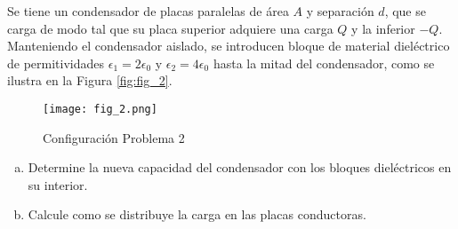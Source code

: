 \noindent Se tiene un condensador de placas paralelas de área $A$ y separación $d$, que se carga de modo tal que su placa superior adquiere una carga $Q$ y la inferior $-Q$. Manteniendo el condensador aislado, se introducen bloque de material dieléctrico de permitividades $\epsilon_1 = 2 \epsilon_0$ y $\epsilon_2 = 4 \epsilon_0$ hasta la mitad del condensador, como se ilustra en la Figura \eqref{fig:fig_2}.

\begin{figure}[H]
    \centering
    \texttt{[image: fig\_2.png]}
    \caption{Configuración Problema 2}
    \label{fig:fig_2}
\end{figure}

\begin{enumerate}[a)]
    \item Determine la nueva capacidad del condensador con los bloques dieléctricos en su interior.
    \item Calcule como se distribuye la carga en las placas conductoras.
\end{enumerate}